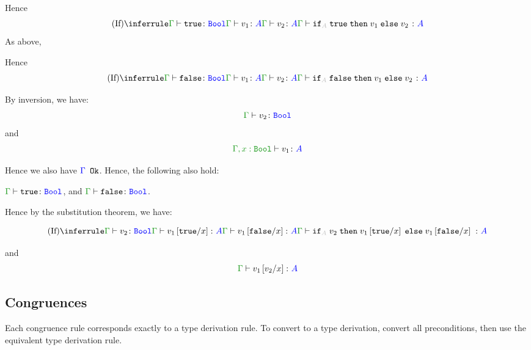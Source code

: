 \documentclass{report}
\begin{document}
        Hence 
        \begin{equation}
                \ntreeruleIII{If}{
                    \gtyperelation{\t}{\B}
                }{
                    \gtyperelation{v_1}{ A}
                }{
                    \gtyperelation{v_2}{ A}
                }{
                    \gtyperelation{\pifthenelse{A}{\t}{v_1}{v_2}}{ A}
                }
        \end{equation}
    As above,

    Hence 
    \begin{equation}
        \ntreeruleIII{If}{
            \gtyperelation{\f}{\B}
        }{
            \gtyperelation{v_1}{ A}
        }{
            \gtyperelation{v_2}{ A}
        }{
            \gtyperelation{\pifthenelse{A}{\f}{v_1}{v_2}}{ A}
        }
\end{equation}

    By inversion, we have:
    \begin{equation}
        \gtyperelation{v_2}{\B}
    \end{equation}
    and
    \begin{equation}
        \typerelation{\G, x:\B}{v_1}{ A}
    \end{equation}
    
    Hence we also have ${\color{blue} \Gamma} \texttt{ Ok}$. Hence, the following also hold:

    $\gtyperelation{\t}{\B}$, and $\gtyperelation{\f}{\B}$.

    Hence by the substitution theorem, we have:

    \begin{equation}
        \ntreeruleIII{If}{
            \gtyperelation{v_2}{\B}
        }{
            \gtyperelation{v_1\ssub{x}{\t}}{ A}
        }{
            \gtyperelation{v_1\ssub{x}{\f}}{ A}
        }{\gtyperelation{\pifthenelse{A}{v_2}{v_1\ssub{x}{\t}}{v_1\ssub{x}{\f}}}{ A}
        }
    \end{equation}

    and 
    \begin{equation}
        \gtyperelation{v_1\ssub{x}{v_2}}{ A}
    \end{equation}

    

    \subsection{Congruences}
Each congruence rule corresponds exactly to a type derivation rule. To convert to a type derivation, convert all preconditions, then use the equivalent type derivation rule.
\end{document}
